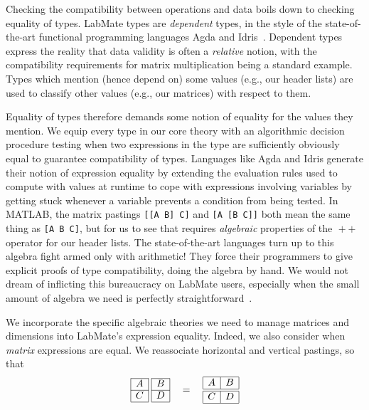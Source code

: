 \documentclass{IMEKO2024}
\newcommand{\append}{\mathop{+\!\!+}}
\newcommand{\remph}{\emph}
\begin{document}
Checking the compatibility between operations and data boils down to checking equality of types. LabMate types are \remph{dependent} types, in the style of the state-of-the-art functional programming languages Agda and Idris~\cite{ydtm,agdathing,idristhing}. Dependent types express the reality that data validity is often a \remph{relative} notion, with the compatibility requirements for matrix multiplication being a standard example. Types which mention (hence depend on) some values (e.g., our header lists) are used to classify other values (e.g., our matrices) with respect to them.

Equality of types therefore demands some notion of equality for the values they mention. We equip every type in our core theory with an algorithmic decision procedure testing when two expressions in the type are sufficiently obviously equal to guarantee compatibility of types. Languages like Agda and Idris generate their notion of expression equality by extending the evaluation rules used to compute with values at runtime to cope with expressions involving variables by getting stuck whenever a variable prevents a condition from being tested. In MATLAB, the matrix pastings \texttt{[[A B] C]} and \texttt{[A [B C]]} both mean the same thing as \texttt{[A B C]}, but for us to see that requires \remph{algebraic} properties of the $\append$ operator for our header lists. The state-of-the-art languages turn up to this algebra fight armed only with arithmetic! They force their programmers to give explicit proofs of type compatibility, doing the algebra by hand. We would not dream of inflicting this bureaucracy on LabMate users, especially when the small amount of algebra we need is perfectly straightforward~\cite{nueqns}.

We incorporate the specific algebraic theories we need to manage matrices and dimensions into LabMate's expression equality. Indeed, we also consider when \remph{matrix} expressions are equal. We reassociate horizontal and vertical pastings, so that
\[\begin{array}[c]{|c|@{}c@{}|c|}
\cline{1-1} \cline{3-3}
A &\;& B \\
\cline{1-1} \cline{3-3}
C &\;& D \\
\cline{1-1} \cline{3-3}
\end{array}
\quad = \quad
\begin{array}[c]{|c|c|}
  \hline
  A & B \\
  \hline
  \hline
  C & D \\
  \hline
\end{array}
\]
\end{document}
